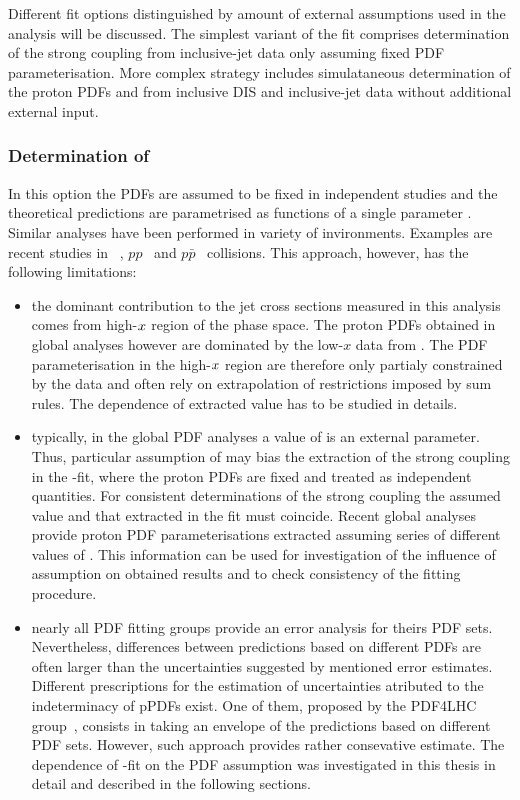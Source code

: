 Different fit options distinguished by amount of external assumptions used in the analysis will be discussed. The simplest variant of the fit comprises determination of the strong coupling from inclusive-jet data only assuming fixed PDF parameterisation. More complex strategy includes simulataneous determination of the proton PDFs and \asz from inclusive DIS and inclusive-jet data without additional external input.
 
\subsubsection{Determination of \asz}
In this option the PDFs are assumed to be fixed in independent studies and the theoretical predictions are parametrised as functions of a single parameter \asz. Similar analyses have been performed in variety of invironments. Examples are recent studies in \ep~\cite{}, $pp$~\cite{} and $p\bar{p}$~\cite{} collisions. This approach, however, has the following limitations:
\begin{itemize}
 \item the dominant contribution to the jet cross sections measured in this analysis comes from high-$\mbox{${x}$}$ region of the phase space. The proton PDFs obtained in global analyses however are dominated by the low-$x$ data from \hera. The PDF parameterisation in the high-$\mbox{${x}$}$ region are therefore only partialy constrained by the data and often rely on extrapolation of restrictions imposed by sum rules. The dependence of extracted \asz value has to be studied in details.
 \item typically, in the global PDF analyses a value of \asz is an external parameter. Thus, particular assumption of \asz may bias the extraction of the strong coupling in the \as-fit, where the proton PDFs are fixed and treated as independent quantities. For consistent determinations of the strong coupling the assumed value and that extracted in the fit must coincide. Recent global analyses provide proton PDF parameterisations extracted assuming series of different values of \asz. This information can be used for investigation of the influence of \asz assumption on obtained results and to check consistency of the fitting procedure.
 \item nearly all PDF fitting groups provide an error analysis for theirs PDF sets. Nevertheless, differences between predictions based on different PDFs are often larger than the uncertainties suggested by mentioned error estimates. Different prescriptions for the estimation of uncertainties atributed to the indeterminacy of pPDFs exist. One of them, proposed by the PDF4LHC group~\cite{pdf4lhc:2011}, consists in taking an envelope of the predictions based on different PDF sets. However, such approach provides rather consevative estimate. The dependence of \asz-fit on the PDF assumption was investigated in this thesis in detail and described in the following sections.
\end{itemize}

